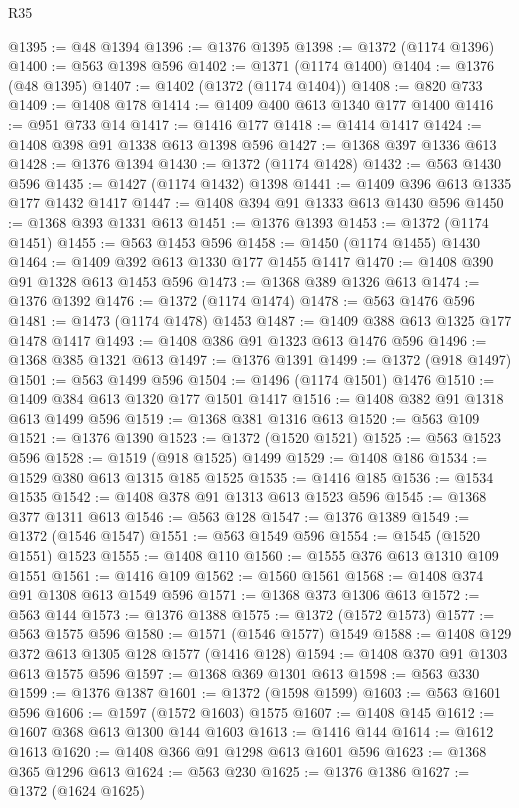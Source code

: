 \begin{lexlean}{R35}
\begin{coremodule}
@1395 := @48 @1394
@1396 := @1376 @1395
@1398 := @1372 (@1174 @1396)
@1400 := @563 @1398 @596
@1402 := @1371 (@1174 @1400)
@1404 := @1376 (@48 @1395)
@1407 := @1402 (@1372 (@1174 @1404))
@1408 := @820 @733
@1409 := @1408 @178
@1414 := @1409 @400 @613 @1340 @177 @1400
@1416 := @951 @733 @14
@1417 := @1416 @177
@1418 := @1414 @1417
@1424 := @1408 @398 @91 @1338 @613 @1398 @596
@1427 := @1368 @397 @1336 @613
@1428 := @1376 @1394
@1430 := @1372 (@1174 @1428)
@1432 := @563 @1430 @596
@1435 := @1427 (@1174 @1432) @1398
@1441 := @1409 @396 @613 @1335 @177 @1432 @1417
@1447 := @1408 @394 @91 @1333 @613 @1430 @596
@1450 := @1368 @393 @1331 @613
@1451 := @1376 @1393
@1453 := @1372 (@1174 @1451)
@1455 := @563 @1453 @596
@1458 := @1450 (@1174 @1455) @1430
@1464 := @1409 @392 @613 @1330 @177 @1455 @1417
@1470 := @1408 @390 @91 @1328 @613 @1453 @596
@1473 := @1368 @389 @1326 @613
@1474 := @1376 @1392
@1476 := @1372 (@1174 @1474)
@1478 := @563 @1476 @596
@1481 := @1473 (@1174 @1478) @1453
@1487 := @1409 @388 @613 @1325 @177 @1478 @1417
@1493 := @1408 @386 @91 @1323 @613 @1476 @596
@1496 := @1368 @385 @1321 @613
@1497 := @1376 @1391
@1499 := @1372 (@918 @1497)
@1501 := @563 @1499 @596
@1504 := @1496 (@1174 @1501) @1476
@1510 := @1409 @384 @613 @1320 @177 @1501 @1417
@1516 := @1408 @382 @91 @1318 @613 @1499 @596
@1519 := @1368 @381 @1316 @613
@1520 := @563 @109
@1521 := @1376 @1390
@1523 := @1372 (@1520 @1521)
@1525 := @563 @1523 @596
@1528 := @1519 (@918 @1525) @1499
@1529 := @1408 @186
@1534 := @1529 @380 @613 @1315 @185 @1525
@1535 := @1416 @185
@1536 := @1534 @1535
@1542 := @1408 @378 @91 @1313 @613 @1523 @596
@1545 := @1368 @377 @1311 @613
@1546 := @563 @128
@1547 := @1376 @1389
@1549 := @1372 (@1546 @1547)
@1551 := @563 @1549 @596
@1554 := @1545 (@1520 @1551) @1523
@1555 := @1408 @110
@1560 := @1555 @376 @613 @1310 @109 @1551
@1561 := @1416 @109
@1562 := @1560 @1561
@1568 := @1408 @374 @91 @1308 @613 @1549 @596
@1571 := @1368 @373 @1306 @613
@1572 := @563 @144
@1573 := @1376 @1388
@1575 := @1372 (@1572 @1573)
@1577 := @563 @1575 @596
@1580 := @1571 (@1546 @1577) @1549
@1588 := @1408 @129 @372 @613 @1305 @128 @1577 (@1416 @128)
@1594 := @1408 @370 @91 @1303 @613 @1575 @596
@1597 := @1368 @369 @1301 @613
@1598 := @563 @330
@1599 := @1376 @1387
@1601 := @1372 (@1598 @1599)
@1603 := @563 @1601 @596
@1606 := @1597 (@1572 @1603) @1575
@1607 := @1408 @145
@1612 := @1607 @368 @613 @1300 @144 @1603
@1613 := @1416 @144
@1614 := @1612 @1613
@1620 := @1408 @366 @91 @1298 @613 @1601 @596
@1623 := @1368 @365 @1296 @613
@1624 := @563 @230
@1625 := @1376 @1386
@1627 := @1372 (@1624 @1625)

\end{coremodule}
\end{lexlean}
